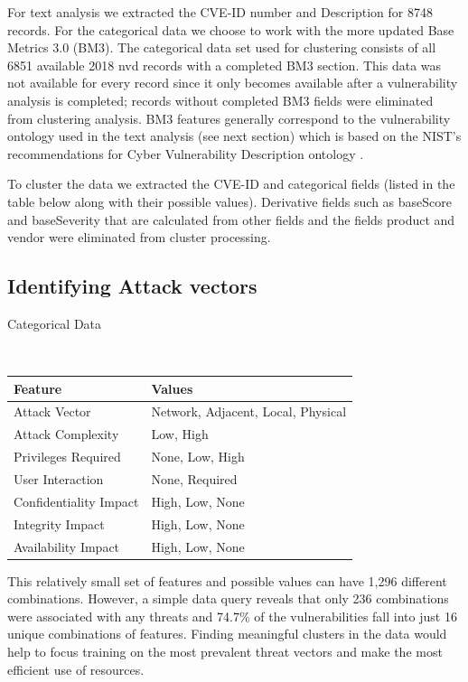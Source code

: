\documentclass{article} %
\begin{document}
For text analysis we extracted the CVE-ID number and Description for 8748 records.  For the categorical data we choose to work with the more updated Base Metrics 3.0 (BM3). The categorical data set used for clustering consists of all 6851 available 2018 nvd records with a completed BM3 section.  This data was not available for every record since it only becomes available after a vulnerability analysis is completed; records without completed BM3 fields were eliminated from clustering analysis.  BM3 features generally correspond to the vulnerability ontology used in the text analysis (see next section) which is based on the NIST's recommendations for Cyber Vulnerability Description ontology \cite{Booth2016DraftOntology}.

To cluster the data we extracted the CVE-ID and categorical fields (listed in the table below along with their possible values).  Derivative fields such as baseScore and baseSeverity that are calculated from other fields and the fields product and vendor were eliminated from cluster processing.    

\subsection{Identifying Attack vectors}
\begin{center}
\caption{Categorical Data} \\
\begin{tabular}{ |l|l| } \hline
Feature & Values\\\hline
Attack Vector & Network, Adjacent, Local, Physical  \\ 
Attack Complexity & Low, High  \\ 
Privileges Required & None, Low, High  \\ 
User Interaction & None, Required  \\ 
Confidentiality Impact & High, Low, None\\
Integrity Impact & High, Low, None\\
Availability Impact & High, Low, None\\
\hline
\end{tabular}
\end{center}

This relatively small set of features and possible values can have 1,296 different combinations.  However, a simple data query reveals that only 236 combinations were associated with any threats and 74.7\% of the vulnerabilities fall into just 16 unique combinations of features.  Finding meaningful clusters in the data would help to focus training on the most prevalent threat vectors and make the most efficient use of resources.  
\end{document}
